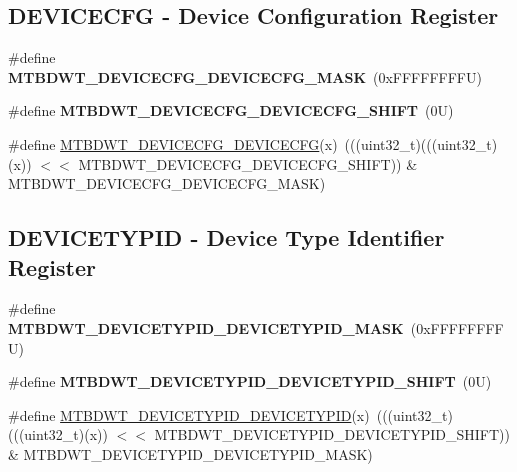 \subsection*{D\+E\+V\+I\+C\+E\+C\+FG -\/ Device Configuration Register}
\begin{DoxyCompactItemize}
\item 
\mbox{\label{group___m_t_b___register___masks_ga90daa5cb85d4d39b819f5c9bc1b20546}} 
\#define {\bfseries M\+T\+B\+D\+W\+T\+\_\+\+D\+E\+V\+I\+C\+E\+C\+F\+G\+\_\+\+D\+E\+V\+I\+C\+E\+C\+F\+G\+\_\+\+M\+A\+SK}~(0x\+F\+F\+F\+F\+F\+F\+F\+F\+U)
\item 
\mbox{\label{group___m_t_b___register___masks_ga2194cb4b21ad650bf3957d3f95f4dbbb}} 
\#define {\bfseries M\+T\+B\+D\+W\+T\+\_\+\+D\+E\+V\+I\+C\+E\+C\+F\+G\+\_\+\+D\+E\+V\+I\+C\+E\+C\+F\+G\+\_\+\+S\+H\+I\+FT}~(0\+U)
\item 
\#define \mbox{\hyperlink{group___m_t_b___register___masks_ga9d21c0abbf05163f867fd5f822a182bf}{M\+T\+B\+D\+W\+T\+\_\+\+D\+E\+V\+I\+C\+E\+C\+F\+G\+\_\+\+D\+E\+V\+I\+C\+E\+C\+FG}}(x)~(((uint32\+\_\+t)(((uint32\+\_\+t)(x)) $<$$<$ M\+T\+B\+D\+W\+T\+\_\+\+D\+E\+V\+I\+C\+E\+C\+F\+G\+\_\+\+D\+E\+V\+I\+C\+E\+C\+F\+G\+\_\+\+S\+H\+I\+FT)) \& M\+T\+B\+D\+W\+T\+\_\+\+D\+E\+V\+I\+C\+E\+C\+F\+G\+\_\+\+D\+E\+V\+I\+C\+E\+C\+F\+G\+\_\+\+M\+A\+SK)
\end{DoxyCompactItemize}
\subsection*{D\+E\+V\+I\+C\+E\+T\+Y\+P\+ID -\/ Device Type Identifier Register}
\begin{DoxyCompactItemize}
\item 
\mbox{\label{group___m_t_b___register___masks_ga6986bcf237d6ff96e25d6458355ef4b8}} 
\#define {\bfseries M\+T\+B\+D\+W\+T\+\_\+\+D\+E\+V\+I\+C\+E\+T\+Y\+P\+I\+D\+\_\+\+D\+E\+V\+I\+C\+E\+T\+Y\+P\+I\+D\+\_\+\+M\+A\+SK}~(0x\+F\+F\+F\+F\+F\+F\+F\+F\+U)
\item 
\mbox{\label{group___m_t_b___register___masks_ga8caaff8277e4bdaee5735e22d6eb6e7c}} 
\#define {\bfseries M\+T\+B\+D\+W\+T\+\_\+\+D\+E\+V\+I\+C\+E\+T\+Y\+P\+I\+D\+\_\+\+D\+E\+V\+I\+C\+E\+T\+Y\+P\+I\+D\+\_\+\+S\+H\+I\+FT}~(0\+U)
\item 
\#define \mbox{\hyperlink{group___m_t_b___register___masks_gaeb9942e9e9c4c3c52ef545b4d49e113d}{M\+T\+B\+D\+W\+T\+\_\+\+D\+E\+V\+I\+C\+E\+T\+Y\+P\+I\+D\+\_\+\+D\+E\+V\+I\+C\+E\+T\+Y\+P\+ID}}(x)~(((uint32\+\_\+t)(((uint32\+\_\+t)(x)) $<$$<$ M\+T\+B\+D\+W\+T\+\_\+\+D\+E\+V\+I\+C\+E\+T\+Y\+P\+I\+D\+\_\+\+D\+E\+V\+I\+C\+E\+T\+Y\+P\+I\+D\+\_\+\+S\+H\+I\+FT)) \& M\+T\+B\+D\+W\+T\+\_\+\+D\+E\+V\+I\+C\+E\+T\+Y\+P\+I\+D\+\_\+\+D\+E\+V\+I\+C\+E\+T\+Y\+P\+I\+D\+\_\+\+M\+A\+SK)
\end{DoxyCompactItemize}
